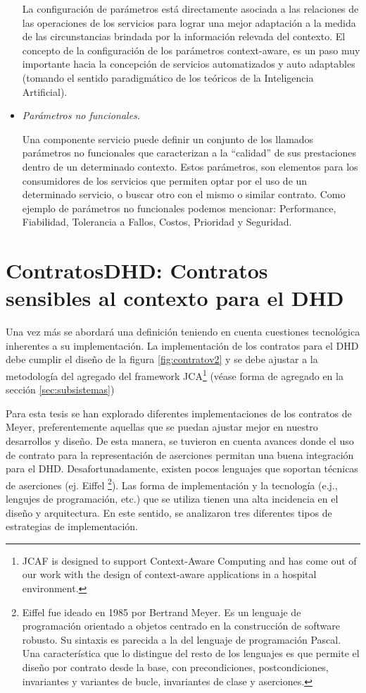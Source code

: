 \begin{itemize}
La configuración de parámetros está directamente asociada a las relaciones de
las operaciones de los servicios para lograr una mejor adaptación a la medida de
las circunstancias brindada por la información relevada del contexto. El
concepto de la configuración de los parámetros context-aware, es un paso muy
importante hacia la concepción de servicios automatizados y auto adaptables
(tomando el sentido paradigmático de los teóricos de la Inteligencia
Artificial).


\item \textit{Parámetros no funcionales.} 

Una componente servicio puede definir un conjunto de los llamados parámetros no
funcionales que caracterizan a la “calidad” de sus prestaciones dentro de un
determinado contexto. Estos parámetros, son elementos para los consumidores de
los servicios que permiten optar por el uso de un determinado servicio, o buscar
otro con el mismo o similar contrato. Como ejemplo de parámetros no funcionales
podemos mencionar: Performance, Fiabilidad, Tolerancia a Fallos, Costos,
Prioridad y Seguridad.

\end{itemize}




\section{ContratosDHD: Contratos sensibles al contexto para el DHD}
\label{sec:estrategiasca}


Una vez más se abordará una definición teniendo en cuenta cuestiones
tecnológica inherentes a su implementación. La implementación
de los contratos para el DHD debe cumplir el dise\~no de la figura \ref{fig:contratov2} y se debe ajustar a la metodología del agregado del framework JCA\footnote{JCAF is designed to support Context-Aware Computing and has come out of our work with the design of context-aware applications in a hospital environment.} (véase forma de agregado en la sección \ref{sec:subsistemas})
 


Para esta tesis se han explorado diferentes implementaciones de los contratos de Meyer, preferentemente aquellas que se puedan ajustar mejor en nuestro desarrollos y dise\~no. De esta manera, se tuvieron en cuenta avances donde el uso de contrato para la representación de aserciones permitan una buena integración para el DHD. Desafortunadamente, existen pocos lenguajes que soportan técnicas de aserciones (ej. Eiffel \footnote{Eiffel fue ideado en 1985 por Bertrand Meyer. Es un lenguaje de programación orientado a objetos centrado en la construcción de software robusto. Su sintaxis es parecida a la del lenguaje de programación Pascal. Una característica que lo distingue del resto de los lenguajes es que permite el diseño por contrato desde la base, con precondiciones, postcondiciones, invariantes y variantes de bucle, invariantes de clase y aserciones.}). Las forma de implementación y la tecnología (e.j., lengujes de programación, etc.) que se utiliza tienen una alta incidencia en el dise\~no y arquitectura. En este sentido, se analizaron tres diferentes tipos de estrategias de implementación.

